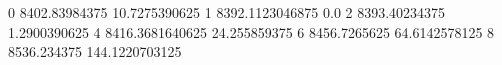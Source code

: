 0 8402.83984375 10.7275390625
1 8392.1123046875 0.0
2 8393.40234375 1.2900390625
4 8416.3681640625 24.255859375
6 8456.7265625 64.6142578125
8 8536.234375 144.1220703125
